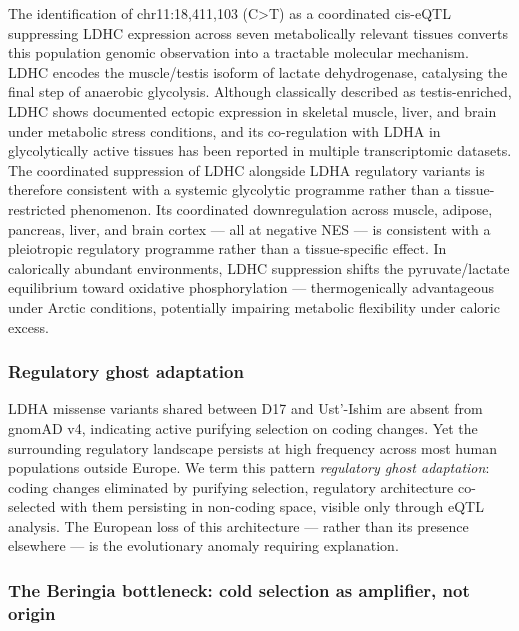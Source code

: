 \documentclass[
  letterpaper,
  DIV=11,
  numbers=noendperiod]{scrartcl}
\begin{document}
The identification of chr11:18,411,103 (C\textgreater T) as a
coordinated cis-eQTL suppressing LDHC expression across seven
metabolically relevant tissues converts this population genomic
observation into a tractable molecular mechanism. LDHC encodes the
muscle/testis isoform of lactate dehydrogenase, catalysing the final
step of anaerobic glycolysis. Although classically described as
testis-enriched, LDHC shows documented ectopic expression in skeletal
muscle, liver, and brain under metabolic stress conditions, and its
co-regulation with LDHA in glycolytically active tissues has been
reported in multiple transcriptomic datasets. The coordinated
suppression of LDHC alongside LDHA regulatory variants is therefore
consistent with a systemic glycolytic programme rather than a
tissue-restricted phenomenon. Its coordinated downregulation across
muscle, adipose, pancreas, liver, and brain cortex --- all at negative
NES --- is consistent with a pleiotropic regulatory programme rather
than a tissue-specific effect. In calorically abundant environments,
LDHC suppression shifts the pyruvate/lactate equilibrium toward
oxidative phosphorylation --- thermogenically advantageous under Arctic
conditions, potentially impairing metabolic flexibility under caloric
excess.

\subsubsection{Regulatory ghost
adaptation}\label{regulatory-ghost-adaptation}

LDHA missense variants shared between D17 and Ust'-Ishim are absent from
gnomAD v4, indicating active purifying selection on coding changes. Yet
the surrounding regulatory landscape persists at high frequency across
most human populations outside Europe. We term this pattern
\emph{regulatory ghost adaptation}: coding changes eliminated by
purifying selection, regulatory architecture co-selected with them
persisting in non-coding space, visible only through eQTL analysis. The
European loss of this architecture --- rather than its presence
elsewhere --- is the evolutionary anomaly requiring explanation.

\subsubsection{The Beringia bottleneck: cold selection as amplifier, not
origin}\label{the-beringia-bottleneck-cold-selection-as-amplifier-not-origin}
\end{document}
